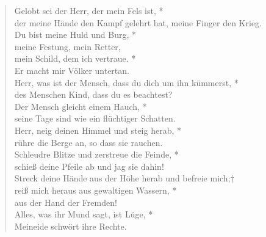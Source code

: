 \vspace{0.3cm}

\def\greinitialformat#1{{\fontsize{40}{40}\selectfont #1}}
\gresetfirstlineaboveinitial{\small \textcolor{red}{Ps 143(144)}}{}
\setaboveinitialseparation{0.72mm}

\vspace{0.3cm}


\begin{verse}
 Gelobt sei der Herr, der mein Fels ist, *\\
der meine Hände den Kampf gelehrt hat, meine Finger den Krieg.\\ \vin  
Du bist meine Huld und Burg, * \\ \vin 
meine Festung, mein Retter, \\
mein Schild, dem ich vertraue. *\\ Er macht mir Völker untertan. \\ \vin 
Herr, was ist der Mensch, dass du dich um ihn kümmerst, *\\ \vin 
des Menschen Kind, dass du es beachtest? \\
Der Mensch gleicht einem Hauch, *\\
seine Tage sind wie ein flüchtiger Schatten.\\ \vin  
Herr, neig deinen Himmel und steig herab, *\\ \vin 
rühre die Berge an, so dass sie rauchen.\\ 
Schleudre Blitze und zerstreue die Feinde, *\\
schieß deine Pfeile ab und jag sie dahin!\\ \vin 
Streck deine Hände aus der Höhe herab und befreie mich;†\\ \vin 
reiß mich heraus aus gewaltigen Wassern, *\\ \vin  aus der Hand der Fremden!\\
Alles, was ihr Mund sagt, ist Lüge, *\\
Meineide schwört ihre Rechte.\\
\end{verse}




\vspace{0.3cm}

\def\greinitialformat#1{{\fontsize{40}{40}\selectfont #1}}
\gresetfirstlineaboveinitial{\small \textcolor{red}{Ap 11; 12}}{}
\setaboveinitialseparation{0.72mm}

